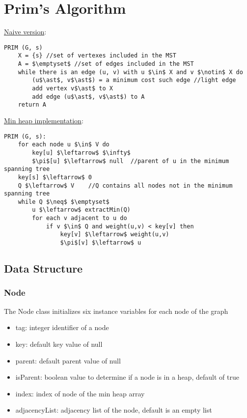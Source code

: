\section{Prim's Algorithm}\label{prim}

\underline{Naive version}:
\begin{lstlisting}[mathescape=true]
PRIM (G, s)
    X = {s} //set of vertexes included in the MST
	A = $\emptyset$ //set of edges included in the MST
	while there is an edge (u, v) with u $\in$ X and v $\notin$ X do
		(u$\ast$, v$\ast$) = a minimum cost such edge //light edge
		add vertex v$\ast$ to X
		add edge (u$\ast$, v$\ast$) to A
	return A	
\end{lstlisting}	
\underline{Min heap implementation}:
\begin{lstlisting}[mathescape=true]
PRIM (G, s):
    for each node u $\in$ V do
        key[u] $\leftarrow$ $\infty$
        $\pi$[u] $\leftarrow$ null  //parent of u in the minimum spanning tree
    key[s] $\leftarrow$ 0
    Q $\leftarrow$ V    //Q contains all nodes not in the minimum spanning tree
    while Q $\neq$ $\emptyset$ 
        u $\leftarrow$ extractMin(Q)
        for each v adjacent to u do
            if v $\in$ Q and weight(u,v) < key[v] then
                key[v] $\leftarrow$ weight(u,v)
                $\pi$[v] $\leftarrow$ u

\end{lstlisting}

\subsection{Data Structure}
	\subsubsection{Node}
	The Node class initializes six instance variables for each node of the graph
	\begin{itemize}
	\item tag: integer identifier of a node 
	\item key: default key value of null
	\item parent: default parent value of null
	\item isParent: boolean value to determine if a node is in a heap, default of true
	\item index: index of node of the min heap array
	\item adjacencyList: adjacency list of the node, default is an empty list
	\end{itemize}
